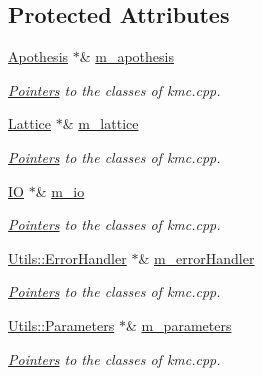 \subsection*{Protected Attributes}
\begin{DoxyCompactItemize}
\item 
\mbox{\label{classPointers_a2573d2d29e2ee82e5eb351e9b340297f}} 
\mbox{\hyperlink{classApothesis}{Apothesis}} $\ast$\& \mbox{\hyperlink{classPointers_a2573d2d29e2ee82e5eb351e9b340297f}{m\+\_\+apothesis}}
\begin{DoxyCompactList}\small\item\em \mbox{\hyperlink{classPointers}{Pointers}} to the classes of kmc.\+cpp. \end{DoxyCompactList}\item 
\mbox{\label{classPointers_aed3e1462a45bffbe51b2de8fb36ea5a0}} 
\mbox{\hyperlink{classLattice}{Lattice}} $\ast$\& \mbox{\hyperlink{classPointers_aed3e1462a45bffbe51b2de8fb36ea5a0}{m\+\_\+lattice}}
\begin{DoxyCompactList}\small\item\em \mbox{\hyperlink{classPointers}{Pointers}} to the classes of kmc.\+cpp. \end{DoxyCompactList}\item 
\mbox{\label{classPointers_aff865007d21415a6ee4a8b03ad3c1bc5}} 
\mbox{\hyperlink{classIO}{IO}} $\ast$\& \mbox{\hyperlink{classPointers_aff865007d21415a6ee4a8b03ad3c1bc5}{m\+\_\+io}}
\begin{DoxyCompactList}\small\item\em \mbox{\hyperlink{classPointers}{Pointers}} to the classes of kmc.\+cpp. \end{DoxyCompactList}\item 
\mbox{\label{classPointers_a38807af78210f98930ae491abb9ebf68}} 
\mbox{\hyperlink{classUtils_1_1ErrorHandler}{Utils\+::\+Error\+Handler}} $\ast$\& \mbox{\hyperlink{classPointers_a38807af78210f98930ae491abb9ebf68}{m\+\_\+error\+Handler}}
\begin{DoxyCompactList}\small\item\em \mbox{\hyperlink{classPointers}{Pointers}} to the classes of kmc.\+cpp. \end{DoxyCompactList}\item 
\mbox{\label{classPointers_ac0cc2a98afeec07800eca1828978e322}} 
\mbox{\hyperlink{classUtils_1_1Parameters}{Utils\+::\+Parameters}} $\ast$\& \mbox{\hyperlink{classPointers_ac0cc2a98afeec07800eca1828978e322}{m\+\_\+parameters}}
\begin{DoxyCompactList}\small\item\em \mbox{\hyperlink{classPointers}{Pointers}} to the classes of kmc.\+cpp. \end{DoxyCompactList}\end{DoxyCompactItemize}


